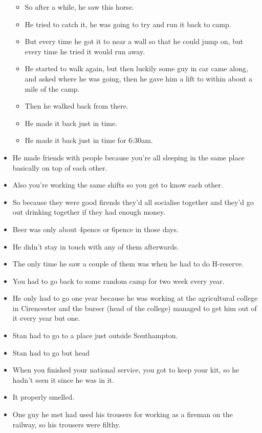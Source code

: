 \documentclass[10pt,twocolumn,letterpaper]{article}
\begin{document}
\begin{itemize}
\begin{itemize}
              \item So after a while, he saw this horse.
              \item He tried to catch it, he was going to try and run it back to camp.
              \item But every time he got it to near a wall so that he could jump on, but every time he tried it would run away.
              \item He started to walk again, but then luckily some guy in car came along, and asked where he was going, then he gave him a lift to within about a mile of the camp.
              \item Then he walked back from there.
              \item He made it back just in time.
              \item He made it back just in time for 6:30am.
          \end{itemize}
    \item He made friends with people because you're all sleeping in the same place basically on top of each other.
    \item Also you're working the same shifts so you get to know each other.
    \item So because they were good firends they'd all socialise together and they'd go out drinking together if they had enough money.
    \item Beer was only about 4pence or 6pence in those days.
    \item He didn't stay in touch with any of them afterwards.
    \item The only time he saw a couple of them was when he had to do H-reserve.
    \item You had to go back to some random camp for two week every year.
    \item He only had to go one year because he was working at the agricultural college in Cirencester and the burser (head of the college) managed to get him out of it every year but one.
    \item Stan had to go to a place just outside Southampton.
    \item Stan had to go but head
    \item When you finished your national service, you got to keep your kit, so he hadn't seen it since he was in it.
    \item It properly smelled.
    \item One guy he met had used his trousers for working as a fireman on the railway, so his trousers were filthy.

\end{itemize}
\end{document}
